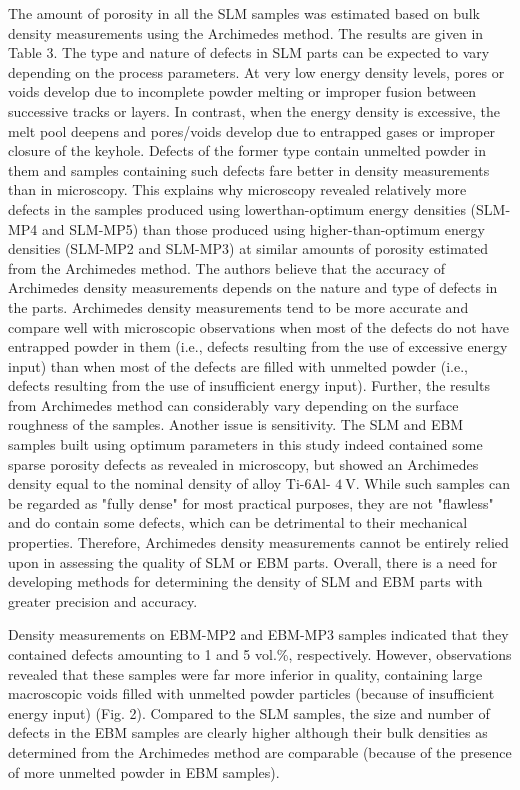 \documentclass[10pt]{article}
\begin{document}
The amount of porosity in all the SLM samples was estimated based on bulk density measurements using the Archimedes method. The results are given in Table 3. The type and nature of defects in SLM parts can be expected to vary depending on the process parameters. At very low energy density levels, pores or voids develop due to incomplete powder melting or improper fusion between successive tracks or layers. In contrast, when the energy density is excessive, the melt pool deepens and pores/voids develop due to entrapped gases or improper closure of the keyhole. Defects of the former type contain unmelted powder in them and samples containing such defects fare better in density measurements than in microscopy. This explains why microscopy revealed relatively more defects in the samples produced using lowerthan-optimum energy densities (SLM-MP4 and SLM-MP5) than those produced using higher-than-optimum energy densities (SLM-MP2 and SLM-MP3) at similar amounts of porosity estimated from the Archimedes method. The authors believe that the accuracy of Archimedes density measurements depends on the nature and type of defects in the parts. Archimedes density measurements tend to be more accurate and compare well with microscopic observations when most of the defects do not have entrapped powder in them (i.e., defects resulting from the use of excessive energy input) than when most of the defects are filled with unmelted powder (i.e., defects resulting from the use of insufficient energy input). Further, the results from Archimedes method can considerably vary depending on the surface roughness of the samples. Another issue is sensitivity. The SLM and EBM samples built using optimum parameters in this study indeed contained some sparse porosity defects as revealed in microscopy, but showed an Archimedes density equal to the nominal density of alloy Ti-6Al- $4 \mathrm{~V}$. While such samples can be regarded as "fully dense" for most practical purposes, they are not "flawless" and do contain some defects, which can be detrimental to their mechanical properties. Therefore, Archimedes density measurements cannot be entirely relied upon in assessing the quality of SLM or EBM parts. Overall, there is a need for developing methods for determining the density of SLM and EBM parts with greater precision and accuracy.

Density measurements on EBM-MP2 and EBM-MP3 samples indicated that they contained defects amounting to 1 and 5 vol.\%, respectively. However, observations revealed that these samples were far more inferior in quality, containing large macroscopic voids filled with unmelted powder particles (because of insufficient energy input) (Fig. 2). Compared to the SLM samples, the size and number of defects in the EBM samples are clearly higher although their bulk densities as determined from the Archimedes method are comparable (because of the presence of more unmelted powder in EBM samples).
\end{document}
